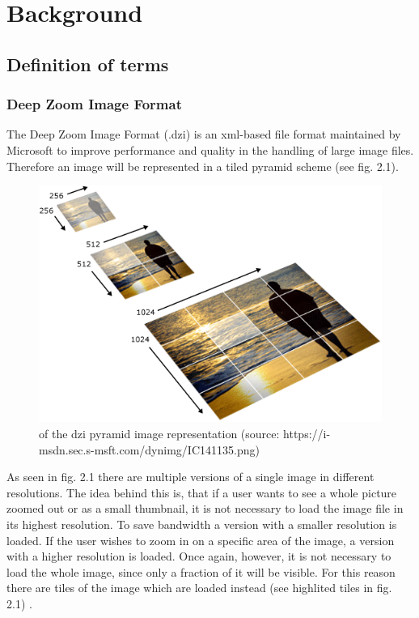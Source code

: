 \chapter{Background}
\section{Definition of terms}
\subsection{Deep Zoom Image Format}
The Deep Zoom Image Format (.dzi) is an xml-based file format maintained by Microsoft to improve performance and quality in the handling of large image files. Therefore an image will be represented in a tiled pyramid scheme (see fig. 2.1).
			
	\begin{figure}[!htbp]
		\begin{center}
			\includegraphics[scale=0.5]{img/dzi_pyramid.png}
				\caption{of the dzi pyramid image representation (source: https://i-msdn.sec.s-msft.com/dynimg/IC141135.png)}
			\label{fig:abb2.1}
		\end{center}
	\end{figure}

As seen in fig. 2.1 there are multiple versions of a single image in different resolutions. The idea behind this is, that if a user wants to see a whole picture zoomed out or as a small thumbnail, it is not necessary to load the image file in its highest resolution. To save bandwidth a version with a smaller resolution is loaded. If the user wishes to zoom in on a specific area of the image, a version with a higher resolution is loaded. Once again, however, it is not necessary to load the whole image, since only a fraction of it will be visible. For this reason there are tiles of the image which are loaded instead (see highlited tiles in fig. 2.1) \cite{web:dzi}.


